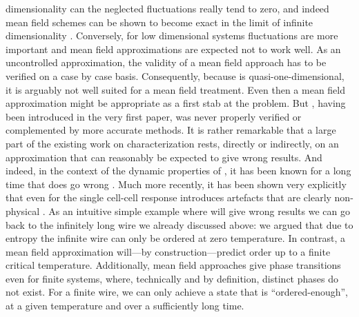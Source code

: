 dimensionality can the neglected fluctuations really tend to zero, and indeed
mean field schemes can be shown to become exact in the limit of infinite
dimensionality \cite{Fehske}. Conversely, for low dimensional systems
fluctuations are more important and mean field approximations are expected not
to work well. As an uncontrolled approximation, the validity of a mean field
approach has to be verified on a case by case basis. Consequently, because
 is quasi-one-dimensional, it is arguably not well suited for a mean
field treatment. Even then a mean field approximation might be appropriate as a
first stab at the problem. But , having been introduced in the very
first  paper, was never properly verified or complemented by more
accurate methods. It is rather remarkable that a large part of the existing work
on  characterization rests, directly or indirectly, on an
approximation that can reasonably be expected to give wrong results. And indeed,
in the context of the dynamic properties of , it has been known for a
long time that  does go wrong \cite{toth2001role}. Much more
recently, it has been shown very explicitly that even for the single cell-cell
response  introduces artefacts that are clearly non-physical
\cite{taucer2012consequences}. As an intuitive simple example where 
will give wrong results we can go back to the infinitely long wire we already
discussed above: we argued that due to entropy the infinite wire can only be
ordered at zero temperature. In contrast, a mean field approximation will---by
construction---predict order up to a finite critical temperature. Additionally,
mean field approaches give phase transitions even for finite systems, where,
technically and by definition, distinct phases do not exist. For a finite wire,
we can only achieve a state that is ``ordered-enough'', at a given temperature and
over a sufficiently long time.

